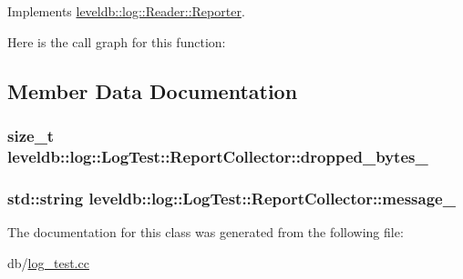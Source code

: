 Implements \hyperlink{classleveldb_1_1log_1_1_reader_1_1_reporter_a2d28d30f9559d5fc9f94af41d239932e}{leveldb\-::log\-::\-Reader\-::\-Reporter}.



Here is the call graph for this function\-:




\subsection{Member Data Documentation}
\hypertarget{classleveldb_1_1log_1_1_log_test_1_1_report_collector_a9eac3288b67c70eb53b4694fcd1f69d6}{
\subsubsection[{dropped\-\_\-bytes\-\_\-}]{\setlength{\rightskip}{0pt plus 5cm}size\-\_\-t leveldb\-::log\-::\-Log\-Test\-::\-Report\-Collector\-::dropped\-\_\-bytes\-\_\-}}\label{classleveldb_1_1log_1_1_log_test_1_1_report_collector_a9eac3288b67c70eb53b4694fcd1f69d6}
\hypertarget{classleveldb_1_1log_1_1_log_test_1_1_report_collector_ad9e0030ff5a33ebad31ff94be7a649d4}{
\subsubsection[{message\-\_\-}]{\setlength{\rightskip}{0pt plus 5cm}std\-::string leveldb\-::log\-::\-Log\-Test\-::\-Report\-Collector\-::message\-\_\-}}\label{classleveldb_1_1log_1_1_log_test_1_1_report_collector_ad9e0030ff5a33ebad31ff94be7a649d4}


The documentation for this class was generated from the following file\-:\begin{DoxyCompactItemize}
\item 
db/\hyperlink{log__test_8cc}{log\-\_\-test.\-cc}\end{DoxyCompactItemize}
